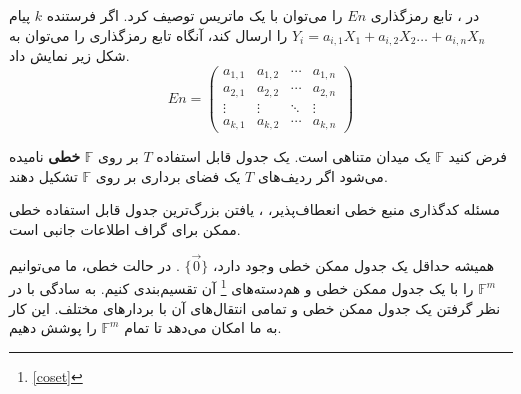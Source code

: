 \begin{note}
    در 
    \lpicod
    ، تابع رمزگذاری 
    $En$
         را می‌توان با یک ماتریس توصیف کرد. اگر فرستنده
    $k$ 
    پیام
     $Y_i = a_{i,1} X_1 + a_{i,2} X_2 \ldots + a_{i,n} X_n$
      را ارسال کند، آنگاه تابع رمزگذاری را می‌توان به شکل زیر نمایش داد.
    \begin{equation*}
        En =
        \begin{pmatrix}
            a_{1,1} & a_{1,2} & \cdots & a_{1,n} \\
            a_{2,1} & a_{2,2} & \cdots & a_{2,n} \\
            \vdots  & \vdots  & \ddots & \vdots  \\
            a_{k,1} & a_{k,2} & \cdots & a_{k,n}
        \end{pmatrix}
    \end{equation*}
\end{note}

\begin{definition}
    فرض کنید 
    $\mathbb{F}$
     یک میدان متناهی است. یک جدول قابل استفاده 
     $T$ 
     بر روی 
     $\mathbb{F}$
      \textbf{
      خطی
    }
       نامیده می‌شود اگر ردیف‌های 
      $T$ 
      یک فضای برداری بر روی 
      $\mathbb{F}$
       تشکیل دهند.
\end{definition}

مسئله کدگذاری منبع خطی انعطاف‌پذیر، 
\lpsicod
، یافتن بزرگ‌ترین جدول قابل استفاده خطی ممکن برای گراف اطلاعات جانبی است.

\begin{remark}
    همیشه حداقل یک جدول ممکن خطی وجود دارد، 
    $\{\overrightarrow{0}\}$
    . در حالت خطی، ما می‌توانیم 
    $\mathbb{F}^m$
     را با یک جدول ممکن خطی و 
     هم‌دسته‌های
     \footnote{\autoref{coset}}
      آن تقسیم‌بندی کنیم. به سادگی با در نظر گرفتن یک جدول ممکن خطی و تمامی انتقال‌های  آن با بردارهای مختلف. این کار به ما امکان می‌دهد تا تمام 
     $\mathbb{F}^m$
      را پوشش دهیم.
\end{remark}

